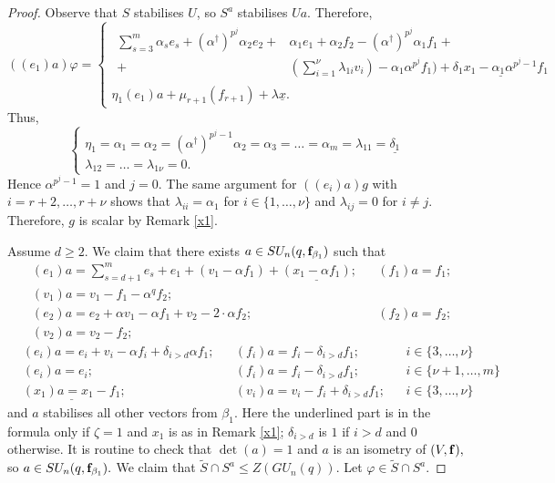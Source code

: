 \begin{proof}
Observe that $S$ stabilises  $U$, so $S^a$ stabilises $Ua.$ Therefore, 
\begin{equation*}%
((e_{1})a)\varphi=
\begin{cases}
\begin{aligned}
\sum_{s=3}^m \alpha_s e_s + (\alpha^{\dagger})^{p^j} \alpha_2 e_2 +& \alpha_1 e_1 +\alpha_2 f_2 -(\alpha^{\dagger})^{p^j} \alpha_1 f_1 + \\ +& (\sum_{i=1}^{\nu}\lambda_{1i} v_i) -\alpha_1 \alpha^{p^j} f_1)+ \underline{\delta_1 x_1 -\alpha_1 \alpha^{p^j-1} f_1}
\end{aligned} \\
\eta_1 (e_1)a+\mu_{r+1}(f_{r+1})+ \lambda \underline{x}.
\end{cases}
\end{equation*}
Thus, $$
\begin{cases}
\eta_1=\alpha_1=\alpha_2=(\alpha^{\dagger})^{p^j-1} \alpha_2 = \alpha_3= \ldots = \alpha_m=\lambda_{11}= \underline{\delta_1}\\
\lambda_{12}= \ldots = \lambda_{1 \nu}=0.
\end{cases}
$$
 Hence $\alpha^{p^j-1}=1$ and $j=0.$
The same argument for $((e_{i})a)g$ with $i=r+2, \ldots, r+ \nu$ shows that $\lambda_{ii}=\alpha_1$ for $i \in \{1, \ldots, \nu\}$ and $\lambda_{ij}=0$ for $i \ne j.$ Therefore, $g$  is scalar by Remark \ref{x1}. 

Assume $d \ge 2.$ 
We claim that there exists  $a \in SU_n(q, {\bf f}_{\beta_1})$ such that 
\begin{align*}
&(e_1)a =\sum_{s=d+1}^m e_s  +e_1  + (v_1 - \alpha f_{1}) + \underline{(x_1 -\alpha f_1)} ; & & (f_{1})a=f_{1}; \\ &  (v_1)a=v_1 -f_1 - \alpha^q f_2; \\
&(e_2)a =  e_2  +\alpha v_1 - \alpha f_1 + v_2 - 2 \cdot \alpha f_2; & & (f_{2})a=f_{2}; \\ &  (v_2)a= v_2-f_2;
\end{align*}
\begin{align*}  
&(e_i)a =e_i+ v_i - \alpha f_i + \delta_{i>d} \alpha f_1 ;   & & (f_{i})a=f_{i} - \delta_{i>d} f_1 ; & &  i\in \{3, \ldots, \nu \}  \\
&(e_i)a =e_i;   & & (f_{i})a=f_{i} - \delta_{i>d} f_1 ; & &  i\in \{\nu+1, \ldots, m \}  \\
&\underline{(x_1)a=x_1-f_{1}};&& (v_i)a= v_i-f_{i} + \delta_{i>d} f_1;&& i\in \{3, \ldots, \nu \}  
\end{align*}
and $a$ stabilises all other vectors from $\beta_1.$ Here the underlined part is in the formula only if ${\zeta}=1$ and $x_1$ is as in Remark \ref{x1}; $\delta_{i>d}$ is $1$ if $i>d$ and $0$ otherwise.  It is routine to check that $\det(a)=1$ and $a$ is an isometry of $(V, {\bf f}),$ so $a \in SU_n(q,{\bf f}_{\beta_1}).$
We claim that $\tilde{S} \cap S^a \le Z(GU_n(q)).$ Let $\varphi \in \tilde{S} \cap S^a$.


\end{proof}
